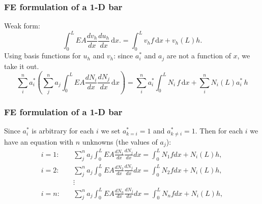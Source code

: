 \documentclass[handout]{beamer}
\begin{document}
\begin{frame}
\frametitle{FE formulation of a 1-D bar}
Weak form:
\begin{equation*}
\int_0^L EA \frac{dv_h}{dx} \frac{du_h}{dx}\, \mathrm{d}x. = \int_0^L v_h f\, \mathrm{d}x + v_h(L)h.
\end{equation*}
Using basis functions for $u_h$ and $v_h$:
since $a_i^*$  and $a_j$ are not a function of $x$, we take it out.
\begin{equation*}
	\sum_i^n a_i^* \left(\sum_j^n a_j \int_0^L EA \frac{dN_i}{dx}\frac{dN_j}{dx}\, \mathrm{d}x \right)  = \sum_i^n a_i^* \int_0^L N_i \,f\,\mathrm{d}x + \sum_i^n N_i(L) a_i^*\,h
\end{equation*}
\end{frame}


\begin{frame}
\frametitle{FE formulation of a 1-D bar}
Since $a_i^*$ is arbitrary for each $i$ we set $a_{k=i}^*=1$ and $a_{k \ne i}^*=1$. Then for each $i$ we have an equation with $n$ unknowns (the values of $a_j$):
\begin{align*}
i = 1: \quad & \sum_j^n {a_j} \int_{0}^{L}EA \frac{dN_1}{dx}\frac{dN_j}{dx} dx = \int_{0}^{L}N_1 f dx + N_i(L)h, \\
i = 2: \quad & \sum_j^n {a_j} \int_{0}^{L}EA \frac{dN_2}{dx}\frac{dN_j}{dx} dx = \int_{0}^{L}N_2 f dx + N_i(L)h, \\
\quad & \vdots \\
i = n: \quad & \sum_j^n {a_j} \int_{0}^{L}EA \frac{dN_n}{dx}\frac{dN_j}{dx} dx = \int_{0}^{L}N_n f dx + N_i(L)h,
\end{align*}
\end{frame}
\end{document}
